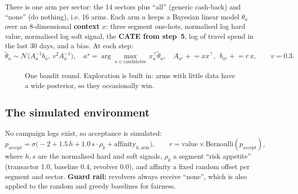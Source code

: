 \documentclass[11pt,a4paper]{article}
\begin{document}
There is one arm per sector: the 14 sectors plus ``all'' (generic cash-back) and ``none'' (do nothing), i.e. 16 arms.
Each arm $a$ keeps a Bayesian linear model $\theta_a$ over an 8-dimensional \textbf{context}
$x$: three segment one-hots, normalised log hard value, normalised log soft signal, the \textbf{CATE from step~5}, log of travel spend in the last 30 days, and a bias.
At each step:
\[
\tilde\theta_a\sim\mathcal{N}\!\big(A_a^{-1}b_a,\ v^2A_a^{-1}\big),\quad
a^\star=\arg\max_{a\in\text{candidates}}\, x_a^\top\tilde\theta_a,\quad
A_{a^\star}\mathrel{+}=x x^\top,\ \ b_{a^\star}\mathrel{+}=r\,x,\qquad v=0.3.
\]

\begin{figure}[h]
\centering
{}
\caption{One bandit round. Exploration is built in: arms with little data have a wide posterior, so they occasionally win.}
\end{figure}

\subsection{The simulated environment}

No campaign logs exist, so acceptance is simulated:
\[
p_{\text{accept}}=\sigma\!\big(-2+1.5\,h+1.0\,s\cdot \rho_k+\text{affinity}_{k,\text{arm}}\big),\qquad
r=\text{value}\times\text{Bernoulli}(p_{\text{accept}}),
\]
where $h,s$ are the normalised hard and soft signals, $\rho_k$ a segment ``risk appetite'' (transactor 1.0, baseline 0.4, revolver 0.0),
and affinity a fixed random offset per segment and sector. \textbf{Guard rail:} revolvers always receive ``none'', which is also applied
to the random and greedy baselines for fairness.
\end{document}
